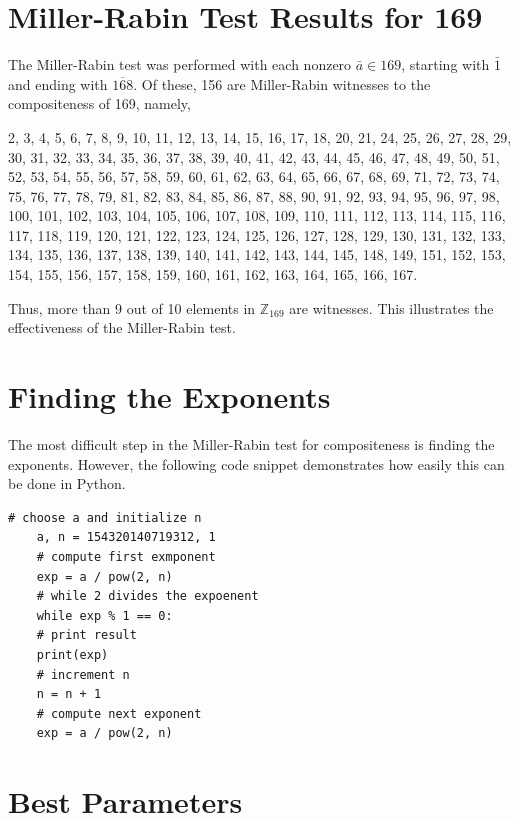 \documentclass[10pt, titlepage]{amsart}
\newcommand\Z{{\mathbb Z}}
\theoremstyle{definition}
\begin{document}
	
	\begin{appendix}
	\section{Miller-Rabin Test Results for 169}\label{appendix:results_for_169}
	
	The Miller-Rabin test was performed with each nonzero $\bar{a} \in 169$, starting with $\bar{1}$ and ending with $\overline{168}$.
	Of these, 156 are Miller-Rabin witnesses to the compositeness of 169, namely, 
	
	\begin{seqsplit}				
	2, 3, 4, 5, 6, 7, 8, 9, 10, 11, 12, 13, 14, 15, 16, 17, 18, 20, 21, 24, 25, 26, 27, 28, 29, 30, 31, 32, 33, 34, 35, 36, 37, 38, 39, 40, 41, 42, 43, 44, 45, 46, 47, 48, 49, 50, 51, 52, 53, 54, 55, 56, 57, 58, 59, 60, 61, 62, 63, 64, 65, 66, 67, 68, 69, 71, 72, 73, 74, 75, 76, 77, 78, 79, 81, 82, 83, 84, 85, 86, 87, 88, 90, 91, 92, 93, 94, 95, 96, 97, 98, 100, 101, 102, 103, 104, 105, 106, 107, 108, 109, 110, 111, 112, 113, 114, 115, 116, 117, 118, 119, 120, 121, 122, 123, 124, 125, 126, 127, 128, 129, 130, 131, 132, 133, 134, 135, 136, 137, 138, 139, 140, 141, 142, 143, 144, 145, 148, 149, 151, 152, 153, 154, 155, 156, 157, 158, 159, 160, 161, 162, 163, 164, 165, 166, 167.
	\end{seqsplit}

	Thus, more than 9 out of 10 elements in $\Z_{169}$ are witnesses.
	This illustrates the effectiveness of the Miller-Rabin test. 
	
	\section{Finding the Exponents}\label{appendix:finding_the_exponents}
	The most difficult step in the Miller-Rabin test for compositeness is finding the exponents. 
	However, the following code snippet demonstrates how easily this can be done in Python.
	\begin{lstlisting}[frame=single]
	# choose a and initialize n
	a, n = 154320140719312, 1
	# compute first exmponent
	exp = a / pow(2, n)
	# while 2 divides the expoenent
	while exp % 1 == 0:
	# print result
	print(exp)
	# increment n
	n = n + 1
	# compute next exponent
	exp = a / pow(2, n)
	\end{lstlisting}
	
	\newpage
	
	\section{Best Parameters}\label{appendix:best_params}
	

\end{appendix}
\end{document}
